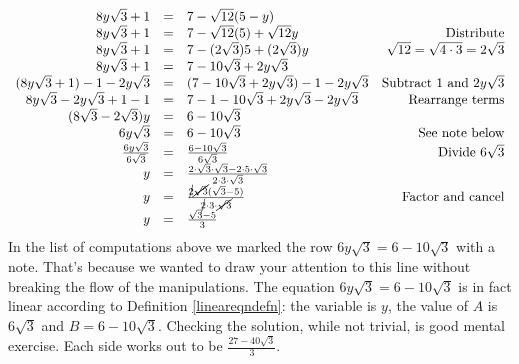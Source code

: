 \documentclass{ximera}
\begin{document}
\begin{example}
\begin{enumerate}
\[\begin{array}{rclr}
8 y \sqrt{3} + 1 & = & 7 - \sqrt{12}(5 - y) & \\  

8 y \sqrt{3} + 1 & = & 7 - \sqrt{12}(5)  + \sqrt{12} y & \text{Distribute} \\  

8 y \sqrt{3} + 1 & = & 7 - (2 \sqrt{3})5 + (2 \sqrt{3})y & \text{$\sqrt{12} = \sqrt{4\cdot 3} = 2 \sqrt{3}$} \\  

8 y \sqrt{3} + 1 & = & 7 - 10 \sqrt{3} + 2y \sqrt{3}  &  \\  

(8 y \sqrt{3} + 1) - 1 - 2y\sqrt{3} & = & (7 - 10 \sqrt{3} + 2y \sqrt{3}) - 1 - 2y\sqrt{3}  & \text{Subtract $1$ and $2y\sqrt{3}$}  \\  

8 y \sqrt{3} - 2y\sqrt{3} + 1 - 1 & = & 7 - 1 - 10 \sqrt{3} + 2y \sqrt{3}  - 2y\sqrt{3}  & \text{Rearrange terms}  \\  

(8\sqrt{3}-2\sqrt{3})y & = & 6 - 10 \sqrt{3}  & \\  

6 y \sqrt{3} & = & 6 - 10 \sqrt{3}  &  \text{See note below} \\  

 \frac{6 y \sqrt{3}}{6 \sqrt{3}}  & = &  \frac{6 - 10 \sqrt{3}}{6 \sqrt{3}}  & \text{Divide $6\sqrt{3}$} \\  

y & = &  \frac{2 \cdot \sqrt{3} \cdot \sqrt{3} - 2 \cdot 5 \cdot \sqrt{3}}{2 \cdot 3 \cdot \sqrt{3}} & \\  

y & = &  \frac{\cancel{2} \cancel{\sqrt{3}}(\sqrt{3} - 5)}{\cancel{2} \cdot 3 \cdot \cancel{\sqrt{3}}} &  \text{Factor and cancel} \\  

y & = &  \frac{\sqrt{3} - 5}{3} & \\ \end{array}\]In the list of computations above we marked the row $6 y \sqrt{3} = 6 - 10 \sqrt{3}$ with a note.  That's because we wanted to draw your attention to this line without breaking the flow of the manipulations.  The equation $6 y \sqrt{3} = 6 - 10 \sqrt{3}$ is in fact linear according to Definition \ref{lineareqndefn}: the variable is $y$, the value of $A$ is $6\sqrt{3}$ and $B = 6 - 10 \sqrt{3}$. Checking the solution, while not trivial, is good mental exercise.  Each side works out to be $\frac{27 - 40 \sqrt{3}}{3}$.


\end{enumerate}
\end{example}
\end{document}

